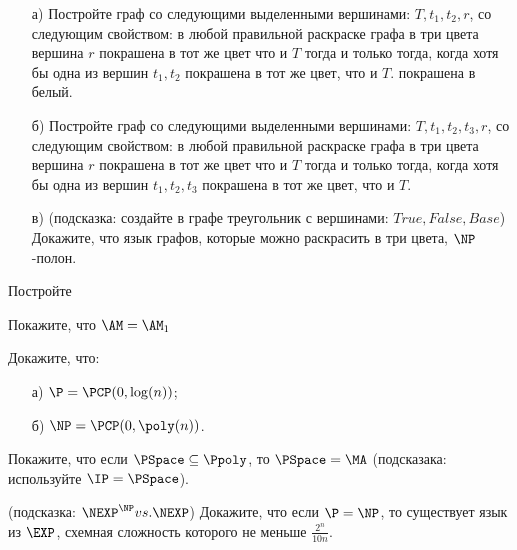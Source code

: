 

\begin{task}
    \begin{enumerate}[topsep = 0pt, itemsep = -1ex]
        \item [а)] Постройте граф со следующими выделенными вершинами: $T, t_1, t_2, r$, со следующим свойством: в любой
            правильной раскраске графа в три цвета вершина $r$ покрашена в тот же цвет что и $T$ тогда и только тогда, когда
            хотя бы одна из вершин $t_1, t_2$ покрашена в тот же цвет, что и $T$.
            покрашена в белый.
        \item [б)] Постройте граф со следующими выделенными вершинами: $T, t_1, t_2, t_3, r$, со следующим свойством: в любой
            правильной раскраске графа в три цвета вершина $r$ покрашена в тот же цвет что и $T$ тогда и только тогда, когда
            хотя бы одна из вершин $t_1, t_2, t_3$ покрашена в тот же цвет, что и $T$.
        \item [в)] (подсказка: создайте в графе треугольник с вершинами: $True, False, Base$) Докажите, что язык графов,
            которые можно раскрасить в три цвета, $\NP$-полон.
    \end{enumerate}
    Постройте 
\end{task}

\begin{task}
    Покажите, что $\AM = \AM_1$
\end{task}

\begin{task}
    Докажите, что:
    \begin{enumerate}[topsep = 0pt, itemsep = -1ex]
        \item [а)] $\P = \PCP(0, \log(n))$;
        \item [б)] $\NP = \PCP(0, \poly(n))$.
    \end{enumerate}
\end{task}


\begin{task}
    Покажите, что если $\PSpace \subseteq \Ppoly$, то $\PSpace = \MA$ (подсказака: используйте $\IP = \PSpace$).
\end{task}

\breakline

\begin{ptask}{26}(подсказка: $\NEXP^{\NP} vs. \NEXP$)
    Докажите, что если $\P = \NP$, то существует язык из $\EXP$, схемная сложность которого не меньше $\frac{2^n}{10 n}$.
\end{ptask}


